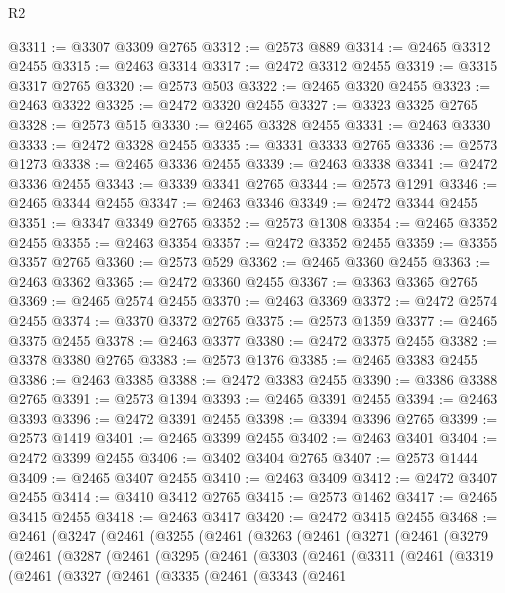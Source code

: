 \begin{lexlean}{R2}
\begin{coremodule}
@3311 := @3307 @3309 @2765
@3312 := @2573 @889
@3314 := @2465 @3312 @2455
@3315 := @2463 @3314
@3317 := @2472 @3312 @2455
@3319 := @3315 @3317 @2765
@3320 := @2573 @503
@3322 := @2465 @3320 @2455
@3323 := @2463 @3322
@3325 := @2472 @3320 @2455
@3327 := @3323 @3325 @2765
@3328 := @2573 @515
@3330 := @2465 @3328 @2455
@3331 := @2463 @3330
@3333 := @2472 @3328 @2455
@3335 := @3331 @3333 @2765
@3336 := @2573 @1273
@3338 := @2465 @3336 @2455
@3339 := @2463 @3338
@3341 := @2472 @3336 @2455
@3343 := @3339 @3341 @2765
@3344 := @2573 @1291
@3346 := @2465 @3344 @2455
@3347 := @2463 @3346
@3349 := @2472 @3344 @2455
@3351 := @3347 @3349 @2765
@3352 := @2573 @1308
@3354 := @2465 @3352 @2455
@3355 := @2463 @3354
@3357 := @2472 @3352 @2455
@3359 := @3355 @3357 @2765
@3360 := @2573 @529
@3362 := @2465 @3360 @2455
@3363 := @2463 @3362
@3365 := @2472 @3360 @2455
@3367 := @3363 @3365 @2765
@3369 := @2465 @2574 @2455
@3370 := @2463 @3369
@3372 := @2472 @2574 @2455
@3374 := @3370 @3372 @2765
@3375 := @2573 @1359
@3377 := @2465 @3375 @2455
@3378 := @2463 @3377
@3380 := @2472 @3375 @2455
@3382 := @3378 @3380 @2765
@3383 := @2573 @1376
@3385 := @2465 @3383 @2455
@3386 := @2463 @3385
@3388 := @2472 @3383 @2455
@3390 := @3386 @3388 @2765
@3391 := @2573 @1394
@3393 := @2465 @3391 @2455
@3394 := @2463 @3393
@3396 := @2472 @3391 @2455
@3398 := @3394 @3396 @2765
@3399 := @2573 @1419
@3401 := @2465 @3399 @2455
@3402 := @2463 @3401
@3404 := @2472 @3399 @2455
@3406 := @3402 @3404 @2765
@3407 := @2573 @1444
@3409 := @2465 @3407 @2455
@3410 := @2463 @3409
@3412 := @2472 @3407 @2455
@3414 := @3410 @3412 @2765
@3415 := @2573 @1462
@3417 := @2465 @3415 @2455
@3418 := @2463 @3417
@3420 := @2472 @3415 @2455
@3468 := @2461
    (@3247
      (@2461
        (@3255
          (@2461
            (@3263
              (@2461
                (@3271
                  (@2461
                    (@3279
                      (@2461
                        (@3287
                          (@2461
                            (@3295
                              (@2461
                                (@3303
                                  (@2461
                                    (@3311
                                      (@2461
                                        (@3319
                                          (@2461
                                            (@3327
                                              (@2461
                                                (@3335
                                                  (@2461
                                                    (@3343
                                                      (@2461

\end{coremodule}
\end{lexlean}
